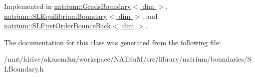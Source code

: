 Implemented in \hyperlink{classnatrium_1_1GradsBoundary_a1f8deb8033e218d7890b0db5d72f5508}{natrium::GradsBoundary$<$ dim $>$}, \hyperlink{classnatrium_1_1SLEquilibriumBoundary_a09e349b179448c54a68245485be642f0}{natrium::SLEquilibriumBoundary$<$ dim $>$}, and \hyperlink{classnatrium_1_1SLFirstOrderBounceBack_ab64572ca24635330d2831d11bb4796db}{natrium::SLFirstOrderBounceBack$<$ dim $>$}.

The documentation for this class was generated from the following file:\begin{DoxyCompactItemize}
\item 
/mnt/fdrive/akraem3m/workspace/NATriuM/src/library/natrium/boundaries/SLBoundary.h\end{DoxyCompactItemize}
